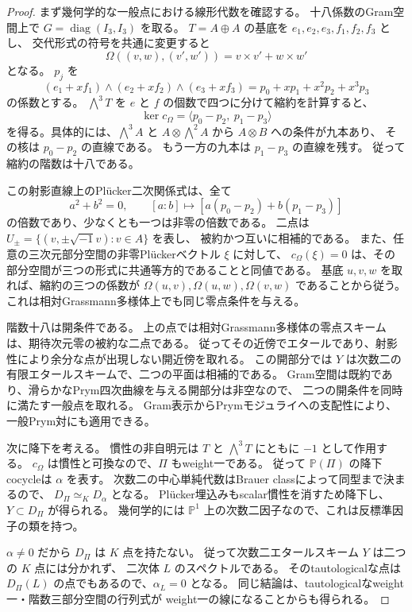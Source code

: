 \begin{proof}
まず幾何学的な一般点における線形代数を確認する。
十八係数のGram空間上で $G=\operatorname{diag}(I_3,I_3)$ を取る。
$T=A\oplus A$ の基底を $e_1,e_2,e_3,f_1,f_2,f_3$ とし、
交代形式の符号を共通に変更すると
\[
 \Omega((v,w),(v',w'))=v\times v'+w\times w'
\]
となる。
$p_j$ を
\[
 (e_1+xf_1)\wedge(e_2+xf_2)\wedge(e_3+xf_3)
   =p_0+xp_1+x^2p_2+x^3p_3
\]
の係数とする。
$\bigwedge^3T$ を $e$ と $f$ の個数で四つに分けて縮約を計算すると、
\[
 \ker c_\Omega=\langle p_0-p_2,\ p_1-p_3\rangle
\]
を得る。具体的には、$\bigwedge^3A$ と
$A\otimes\bigwedge^2A$ から $A\otimes B$ への条件が九本あり、
その核は $p_0-p_2$ の直線である。
もう一方の九本は $p_1-p_3$ の直線を残す。
従って縮約の階数は十八である。

この射影直線上のPl\"ucker二次関係式は、全て
\[
 a^2+b^2=0,\qquad
 [a:b]\longmapsto[a(p_0-p_2)+b(p_1-p_3)]
\]
の倍数であり、少なくとも一つは非零の倍数である。
二点は $U_\pm=\{(v,\pm\sqrt{-1}v):v\in A\}$ を表し、
被約かつ互いに相補的である。
また、任意の三次元部分空間の非零Pl\"uckerベクトル $\xi$ に対して、
$c_\Omega(\xi)=0$ は、その部分空間が三つの形式に共通等方的であることと同値である。
基底 $u,v,w$ を取れば、縮約の三つの係数が
$\Omega(u,v),\Omega(u,w),\Omega(v,w)$ であることから従う。
これは相対Grassmann多様体上でも同じ零点条件を与える。

階数十八は開条件である。
上の点では相対Grassmann多様体の零点スキームは、期待次元零の被約な二点である。
従ってその近傍でエタールであり、射影性により余分な点が出現しない開近傍を取れる。
この開部分では $Y$ は次数二の有限エタールスキームで、二つの平面は相補的である。
Gram空間は既約であり、滑らかなPrym四次曲線を与える開部分は非空なので、
二つの開条件を同時に満たす一般点を取れる。
Gram表示からPrymモジュライへの支配性により、一般Prym対にも適用できる。

次に降下を考える。
慣性の非自明元は $T$ と $\bigwedge^3T$ にともに $-1$ として作用する。
$c_\Omega$ は慣性と可換なので、$\Pi$ もweight一である。
従って $\mathbb P(\Pi)$ の降下cocycleは $\alpha$ を表す。
次数二の中心単純代数はBrauer classによって同型まで決まるので、
$D_\Pi\simeq_KD_\alpha$ となる。
Pl\"ucker埋込みもscalar慣性を消すため降下し、$Y\subset D_\Pi$ が得られる。
幾何学的には $\mathbb P^1$ 上の次数二因子なので、これは反標準因子の類を持つ。

$\alpha\ne0$ だから $D_\Pi$ は $K$ 点を持たない。
従って次数二エタールスキーム $Y$ は二つの $K$ 点には分かれず、
二次体 $L$ のスペクトルである。
そのtautologicalな点は $D_\Pi(L)$ の点でもあるので、$\alpha_L=0$ となる。
同じ結論は、tautologicalなweight一・階数三部分空間の行列式が
weight一の線になることからも得られる。


\end{proof}
